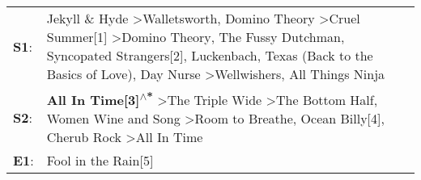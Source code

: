 \begin{supertabular}{p{0.03\textwidth}p{0.92\textwidth}}
 \textbf{S1}:  &  Jekyll \& Hyde\textsuperscript{} \textgreater \enspace Walletsworth\textsuperscript{}, \enspace Domino Theory\textsuperscript{} \textgreater \enspace Cruel Summer[1]\textsuperscript{} \textgreater \enspace Domino Theory\textsuperscript{}, \enspace The Fussy Dutchman\textsuperscript{}, \enspace Syncopated Strangers[2]\textsuperscript{}, \enspace Luckenbach, Texas (Back to the Basics of Love)\textsuperscript{}, \enspace Day Nurse\textsuperscript{} \textgreater \enspace Wellwishers\textsuperscript{}, \enspace All Things Ninja\textsuperscript{}  \enspace  \\
 \textbf{S2}:  &                                                                                                                                                   \textbf{All In Time[3]\textsuperscript{$\wedge$*}} \textgreater \enspace The Triple Wide\textsuperscript{} \textgreater \enspace The Bottom Half\textsuperscript{}, \enspace Women Wine and Song\textsuperscript{} \textgreater \enspace Room to Breathe\textsuperscript{}, \enspace Ocean Billy[4]\textsuperscript{}, \enspace Cherub Rock\textsuperscript{} \textgreater \enspace All In Time\textsuperscript{}  \enspace  \\
 \textbf{E1}:  &                                                                                                                                                                                                                                                                                                                                                                                                                                                                                                                               Fool in the Rain[5]\textsuperscript{}  \enspace  \\
\end{supertabular}
